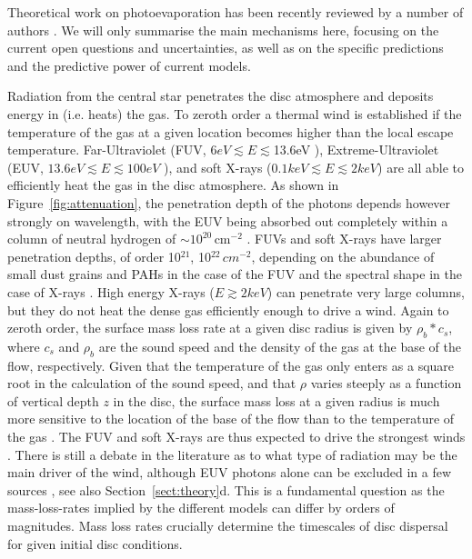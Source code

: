 \documentclass{rsos}
\begin{document}
Theoretical work on photoevaporation has been recently reviewed by a number of authors 
\cite{2011ARA&A..49..195A, 2014prpl.conf..475A, 2016SSRv..205..125G}. We will only summarise the main mechanisms here, focusing on the current open questions and uncertainties, as well as on the specific predictions and the predictive power of current models. 

Radiation from the central star penetrates the disc atmosphere and deposits energy in (i.e. heats) the gas. To zeroth order a thermal wind is established if the temperature of the gas at a given location becomes higher than the local escape temperature. Far-Ultraviolet (FUV, $6eV \lesssim E \lesssim $13.6eV ), Extreme-Ultraviolet (EUV, $13.6 eV \lesssim E \lesssim 100 eV$  ), and soft X-rays ($0.1keV  \lesssim E \lesssim 2 keV$) are all able to efficiently heat the gas in the disc atmosphere. As shown in Figure~\ref{fig:attenuation}, the penetration depth of the photons depends however strongly on wavelength, with the EUV being absorbed out completely within a column of neutral hydrogen of $\sim10^{20}$\,cm$^{-2}$ 
\cite{2009ApJ...703.1203H}. FUVs and soft X-rays have larger penetration depths, of order 10$^{21}$, 10$^{22}\,cm^{-2}$, depending on the abundance of small dust grains and PAHs in the case of the FUV and the spectral shape in the case of X-rays \cite{2009ApJ...699.1639E}. High energy X-rays ($E\gtrsim 2keV$) can penetrate very large columns, but they do not heat the dense gas efficiently enough to drive a wind.
Again to zeroth order, the surface mass loss rate at a given disc radius is given by $\rho_b*c_s$, where $c_s$ and $\rho_b$ are the sound speed and the density of the gas at the base of the flow, respectively. Given that the temperature of the gas only enters as a square root in the calculation of the sound speed, and that $\rho$ varies steeply as a function of vertical depth $z$ in the disc, the surface mass loss at a given radius is much more sensitive to the location of the base of the flow than to the temperature of the gas 
\cite{2010MNRAS.402.2735E}. The FUV and soft X-rays are thus expected to drive the strongest winds 
\cite{2008ApJ...688..398E, 2009ApJ...699.1639E, 2010MNRAS.401.1415O, 2011MNRAS.412...13O, 2012MNRAS.422.1880O, 2009ApJ...705.1237G}. There is still a debate in the literature as to what type of radiation may be the main driver of the wind, although EUV photons alone can be excluded in a few sources \cite{2004A&A...417..793P}, see also Section~\ref{sect:theory}d. This is a fundamental question as the mass-loss-rates implied by the different models can differ by orders of magnitudes. Mass loss rates crucially determine the timescales of disc dispersal for given initial disc conditions.
\end{document}
